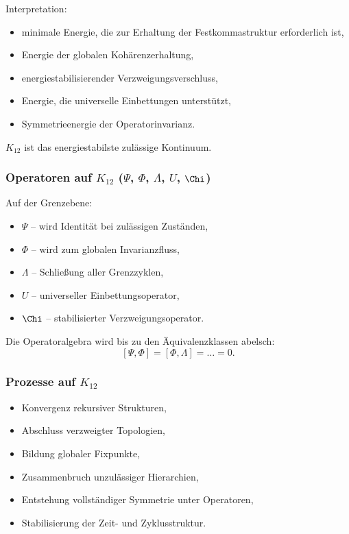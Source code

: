 Interpretation:
\begin{itemize}
    \item minimale Energie, die zur Erhaltung der Festkommastruktur erforderlich ist,
    \item Energie der globalen Kohärenzerhaltung,
    \item energiestabilisierender Verzweigungsverschluss,
    \item Energie, die universelle Einbettungen unterstützt,
    \item Symmetrieenergie der Operatorinvarianz.
\end{itemize}

$K_{12}$ ist das energiestabilste zulässige Kontinuum.

\subsubsection{Operatoren auf $K_{12}$ ($\Psi$, $\Phi$, $\Lambda$, $U$, $\Chi$)}

Auf der Grenzebene:

\begin{itemize}
    \item $\Psi$ – wird Identität bei zulässigen Zuständen,
    \item $\Phi$ – wird zum globalen Invarianzfluss,
    \item $\Lambda$ – Schließung aller Grenzzyklen,
    \item $U$ – universeller Einbettungsoperator,
    \item $\Chi$ – stabilisierter Verzweigungsoperator.
\end{itemize}

Die Operatoralgebra wird bis zu den Äquivalenzklassen abelsch:
\[
[\Psi,\Phi]=[\Phi,\Lambda]=\dots = 0.
\]

\subsubsection{Prozesse auf $K_{12}$}

\begin{itemize}
    \item Konvergenz rekursiver Strukturen,
    \item Abschluss verzweigter Topologien,
    \item Bildung globaler Fixpunkte,
    \item Zusammenbruch unzulässiger Hierarchien,
    \item Entstehung vollständiger Symmetrie unter Operatoren,
    \item Stabilisierung der Zeit- und Zyklusstruktur.
\end{itemize}

